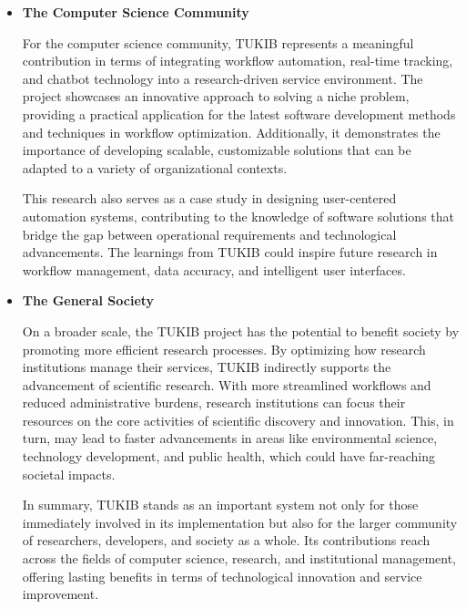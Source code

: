 \begin{itemize}
\item \textbf{The Computer Science Community}

\subitem For the computer science community, TUKIB represents a meaningful contribution in terms of integrating workflow automation, real-time tracking, and chatbot technology into a research-driven service environment. The project showcases an innovative approach to solving a niche problem, providing a practical application for the latest software development methods and techniques in workflow optimization. Additionally, it demonstrates the importance of developing scalable, customizable solutions that can be adapted to a variety of organizational contexts.

\subitem This research also serves as a case study in designing user-centered automation systems, contributing to the knowledge of software solutions that bridge the gap between operational requirements and technological advancements. The learnings from TUKIB could inspire future research in workflow management, data accuracy, and intelligent user interfaces.\newline

\item \textbf{The General Society}

\subitem On a broader scale, the TUKIB project has the potential to benefit society by promoting more efficient research processes. By optimizing how research institutions manage their services, TUKIB indirectly supports the advancement of scientific research. With more streamlined workflows and reduced administrative burdens, research institutions can focus their resources on the core activities of scientific discovery and innovation. This, in turn, may lead to faster advancements in areas like environmental science, technology development, and public health, which could have far-reaching societal impacts.\newline

\subitem In summary, TUKIB stands as an important system not only for those immediately involved in its implementation but also for the larger community of researchers, developers, and society as a whole. Its contributions reach across the fields of computer science, research, and institutional management, offering lasting benefits in terms of technological innovation and service improvement.

\end {itemize}

